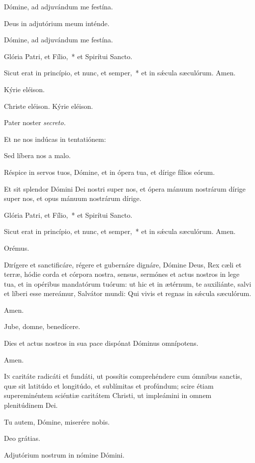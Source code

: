 \rr Dómine, ad adjuvándum me festína.

\vv Deus in adjutórium meum inténde.

\rr Dómine, ad adjuvándum me festína.

\vv Glória Patri, et Fílio,~* et Spirítui Sancto.

\rr Sicut erat in princípio, et nunc, et semper,~* et in sǽcula sæculórum. Amen.

\vv Kýrie eléison.

\rr Christe eléison. Kýrie eléison.

\vv Pater noster \textit{secreto.}

\vv Et ne nos indúcas in tentatiónem:

\rr Sed líbera nos a malo.

\vv Réspice in servos tuos, Dómine, et in ópera tua, et dírige fílios eórum.

\rr Et sit splendor Dómini Dei nostri super nos, et ópera mánuum nostrárum
dírige super nos, et opus mánuum nostrárum dírige.

\vv Glória Patri, et Fílio,~* et Spirítui Sancto.

\rr Sicut erat in princípio, et nunc, et semper,~* et in sǽcula sæculórum. Amen.

Orémus.

\lettrine{D}{i}rígere et sanctificáre, régere et gubernáre dignáre, Dómine Deus, Rex
cæli et terræ, hódie corda et córpora nostra, sensus, sermónes et actus nostros in
lege tua, et in opéribus mandatórum tuórum: ut hic et in ætérnum, te auxiliánte,
salvi et líberi esse mereámur, Salvátor mundi: Qui vivis et regnas in sǽcula
sæculórum.

\rr Amen.

\vv Jube, domne, benedícere.


Dies et actus nostros in sua pace dispónat Dóminus omnípotens.

\rr Amen.

\lettrine{I}{n} caritáte radicáti et fundáti, ut possítis comprehéndere cum ómnibus sanctis, quæ sit latitúdo et longitúdo, et sublímitas et profúndum; scire étiam supereminéntem sciéntiæ caritátem Christi, ut impleámini in omnem plenitúdinem Dei.

\vv Tu autem, Dómine, miserére nobis.

\rr Deo grátias.

\vv Adjutórium nostrum in nómine Dómini.

